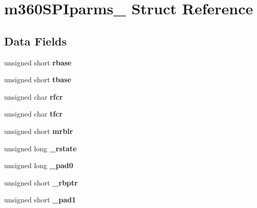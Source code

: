 \hypertarget{structm360SPIparms__}{}\section{m360\+S\+P\+Iparms\+\_\+ Struct Reference}
\label{structm360SPIparms__}
\subsection*{Data Fields}
\begin{DoxyCompactItemize}
\item 
\mbox{\label{structm360SPIparms___a97c19ae3aa672dadcaa3bfd2b8bc45ba}} 
unsigned short {\bfseries rbase}
\item 
\mbox{\label{structm360SPIparms___acbafd2bf256bc737099e8c0aae47e0b0}} 
unsigned short {\bfseries tbase}
\item 
\mbox{\label{structm360SPIparms___a8ab599c86fa735f6eb72deaa9572778d}} 
unsigned char {\bfseries rfcr}
\item 
\mbox{\label{structm360SPIparms___ad5f7ad030b60ed56d5eda65af7cb9d72}} 
unsigned char {\bfseries tfcr}
\item 
\mbox{\label{structm360SPIparms___ab81bf3aa8cc6dd296584bc4d382e3d53}} 
unsigned short {\bfseries mrblr}
\item 
\mbox{\label{structm360SPIparms___a0e7bea202798d54ba2823bc1b22110ec}} 
unsigned long {\bfseries \+\_\+rstate}
\item 
\mbox{\label{structm360SPIparms___a147e6c541e3e71329574b0d769560e01}} 
unsigned long {\bfseries \+\_\+pad0}
\item 
\mbox{\label{structm360SPIparms___ae2cbbdc5798708a060c55963728e4b38}} 
unsigned short {\bfseries \+\_\+rbptr}
\item 
\mbox{\label{structm360SPIparms___aad6d1feb5ab50caf1c44aedd6a63f811}} 
unsigned short {\bfseries \+\_\+pad1}
\item 

\end{DoxyCompactItemize}
